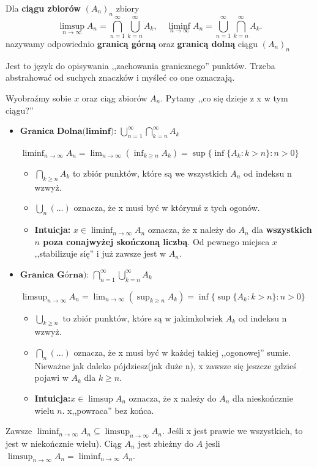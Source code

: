 \begin{definition}
	Dla \textbf{ciągu zbiorów}  $\left( A_{n} \right)_{n} $ zbiory
	\[
		\limsup_{n \to \infty} A_{n} = \bigcap_{n=1} ^{\infty}\bigcup_{k=n} ^{\infty}A_{k}, \quad \liminf_{n \to \infty}A_{n} = \bigcup_{n=1}^{\infty}\bigcap_{k=n} ^{\infty}A_{k} 
	.\] 
	nazywamy odpowiednio \textbf{granicą górną} oraz \textbf{granicą dolną} ciągu $\left( A_{n} \right)_{n}$  
\end{definition} 
\begin{intuition}
	Jest to język do opisywania ,,zachowania granicznego'' punktów. Trzeba abstrahować od suchych znaczków i myśleć co one oznaczają.

	Wyobraźmy sobie $x$ oraz ciąg zbiorów $A_{n}$. Pytamy ,,co się dzieje z x w tym ciągu?''

	\begin{itemize}
		\item $\textbf{Granica Dolna(liminf): } \bigcup_{n=1}^{\infty}\bigcap_{k=n} ^{\infty}A_{k}$ 

			$\liminf_{n \to \infty} A_{n} = \lim_{n \to \infty} \left( \inf_{k\ge n} A_{k}  \right)= \sup \{ \inf\{A_{k}: k>n\}: n>0 \} $
			\begin{itemize}[label=$\ast$]
				\item $\bigcap_{k\ge n} A_{k}$ to zbiór punktów, które są we wszystkich $A_{n}$  od indeksu n wzwyż.
				\item $\bigcup_{n} \left( \ldots \right) $ oznacza, że x musi być w którymś z tych ogonów.
				\item \textbf{Intuicja:} $x\in \liminf_{n \to \infty} A_{n}$ oznacza, że x należy do $A_{n}$ dla \textbf{wszystkich $n$ poza conajwyżej skończoną liczbą}. Od pewnego miejsca $x$ ,,stabilizuje się'' i już zawsze jest w $A_{n}$.  
			\end{itemize}
		\item $\textbf{Granica Górna): } \bigcap_{n=1}^{\infty}\bigcup_{k=n} ^{\infty}A_{k}$ 

			$\limsup_{n \to \infty} A_{n} = \lim_{n \to \infty} (\sup_{k\ge n}A_{k}) = \inf \{ \sup \{A_{k}: k>n\}: n>0 \} $
			\begin{itemize}[label=$\ast$]
				\item $\bigcup_{k\ge n} $ to zbiór punktów, które są w jakimkolwiek $A_{k}$ od indeksu n wzwyż.
				\item $\bigcap_{n} \left( \ldots \right) $ oznacza, że x musi być w każdej takiej ,,ogonowej'' sumie. Nieważne jak daleko pójdziesz(jak duże n), x zawsze się jeszcze gdzieś pojawi w $A_{k}$ dla $k\ge n$.
				\item \textbf{Intuicja:}$x\in \limsup A_{n}$ oznacza, że x należy do $A_{n}$ dla nieskończnie wielu  $n$. x,,powraca'' bez końca.
			\end{itemize}
	\end{itemize}
	Zawsze $\liminf_{n \to \infty} A_{n} \subseteq \limsup_{n \to \infty} A_{n}$. Jeśli x jest prawie we wszystkich, to jest w niekończnie wielu). Ciąg $A_{n}$ jest zbieżny do $A$ jesli $\limsup_{n \to \infty}A_{n} = \liminf_{n \to \infty} A_{n}$.
\end{intuition} 

